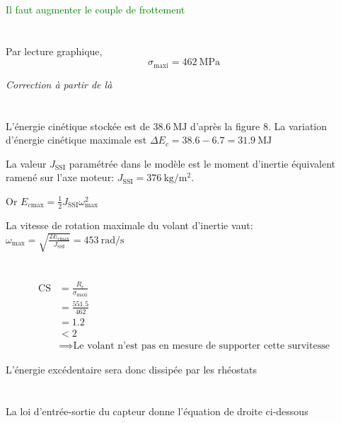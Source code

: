 \documentclass{article}
\begin{document}
\textcolor{green}{Il faut augmenter le couple de frottement}

\section{}
Par lecture graphique,
\[
	\sigma_\text{maxi} = \SI{462}{\mega\pascal}
\] 

\emph{Correction à partir de là} 

\section{}

L'énergie cinétique stockée est de $\SI{38.6}{\mega\joule}$ d'après la figure 8. La variation d'énergie cinétique maximale est $\Delta E_c = 38.6 - 6.7 = \SI{31.9}{\mega\joule}$ 

La valeur $J_{\text{SSI}}$ paramétrée dans le modèle est le moment d'inertie équivalent ramené sur l'axe moteur: $J_\text{SSI} = \SI{376}{\kilo\gram\per\meter\squared}$.

Or $E_{c\text{max}} = \frac{1}{2}J_{\text{SSI}}\omega^2_\text{max}$ 

La vitesse de rotation maximale du volant d'inertie vaut: $\omega_\text{max} = \sqrt{\frac{2E_{c\text{max}}}{J_\text{SSI}}} = \SI{453}{\radian\per\second}$

\section{}
\begin{align*}
	\text{CS} &= \frac{R_e}{\sigma_\text{maxi}} \\
	&= \frac{551.5}{462} \\
	&= 1.2 \\
	&< 2 \\
	&\implies \text{Le volant n'est pas en mesure de supporter cette survitesse}
\end{align*}

L'énergie excédentaire sera donc dissipée par les rhéostats

\section{}

\section{}
La loi d'entrée-sortie du capteur donne l'équation de droite ci-dessous
\end{document}
